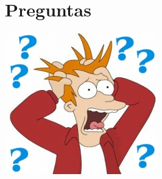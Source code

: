\documentclass{beamer}
\begin{document}



\section{Preguntas}
\begin{frame}
	\begin{center}
		\bigskip		
		\includegraphics[scale=.5]{Imagenes/preg.jpg}
	\end{center}
\end{frame}
\end{document}
